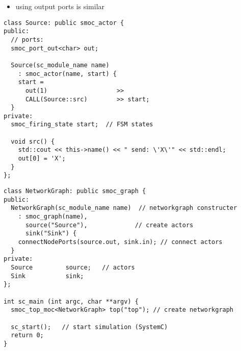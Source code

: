 \begin{frame}[fragile=singleslide]
\begin{itemize}
\item using output ports is similar
\end{itemize}
\begin{lstlisting}
class Source: public smoc_actor {
public:
  // ports:
  smoc_port_out<char> out;

  Source(sc_module_name name)
    : smoc_actor(name, start) {
    start = 
      out(1)                   >>
      CALL(Source::src)        >> start;
  }
private:
  smoc_firing_state start;  // FSM states

  void src() {
    std::cout << this->name() << " send: \'X\'" << std::endl;
    out[0] = 'X';
  }
};
\end{lstlisting}
\end{frame}




\begin{frame}[fragile=singleslide]
\begin{lstlisting}
class NetworkGraph: public smoc_graph {
public:
  NetworkGraph(sc_module_name name)  // networkgraph constructer
    : smoc_graph(name),
      source("Source"),             // create actors
      sink("Sink") {
    connectNodePorts(source.out, sink.in); // connect actors
  }
private:
  Source         source;   // actors
  Sink           sink;
};

int sc_main (int argc, char **argv) {
  smoc_top_moc<NetworkGraph> top("top"); // create networkgraph

  sc_start();   // start simulation (SystemC)
  return 0;
}
\end{lstlisting}
\end{frame}




